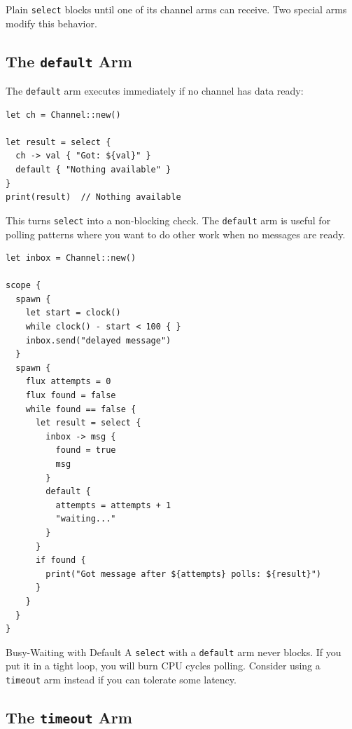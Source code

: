 Plain \lstinline|select| blocks until one of its channel arms can receive.
Two special arms modify this behavior.

\subsection{The \texttt{default} Arm}

The \lstinline|default| arm executes immediately if no channel has data ready:

\begin{lstlisting}[language=Lattice, caption={Select with default}]
let ch = Channel::new()

let result = select {
  ch -> val { "Got: ${val}" }
  default { "Nothing available" }
}
print(result)  // Nothing available
\end{lstlisting}

This turns \lstinline|select| into a non-blocking check.
The \lstinline|default| arm is useful for polling patterns where you want to do other work when no messages are ready.

\begin{lstlisting}[language=Lattice, caption={Polling pattern with default}]
let inbox = Channel::new()

scope {
  spawn {
    let start = clock()
    while clock() - start < 100 { }
    inbox.send("delayed message")
  }
  spawn {
    flux attempts = 0
    flux found = false
    while found == false {
      let result = select {
        inbox -> msg {
          found = true
          msg
        }
        default {
          attempts = attempts + 1
          "waiting..."
        }
      }
      if found {
        print("Got message after ${attempts} polls: ${result}")
      }
    }
  }
}
\end{lstlisting}

\begin{warnbox}{Busy-Waiting with Default}
A \lstinline|select| with a \lstinline|default| arm never blocks.
If you put it in a tight loop, you will burn CPU cycles polling.
Consider using a \lstinline|timeout| arm instead if you can tolerate some latency.
\end{warnbox}

\subsection{The \texttt{timeout} Arm}


